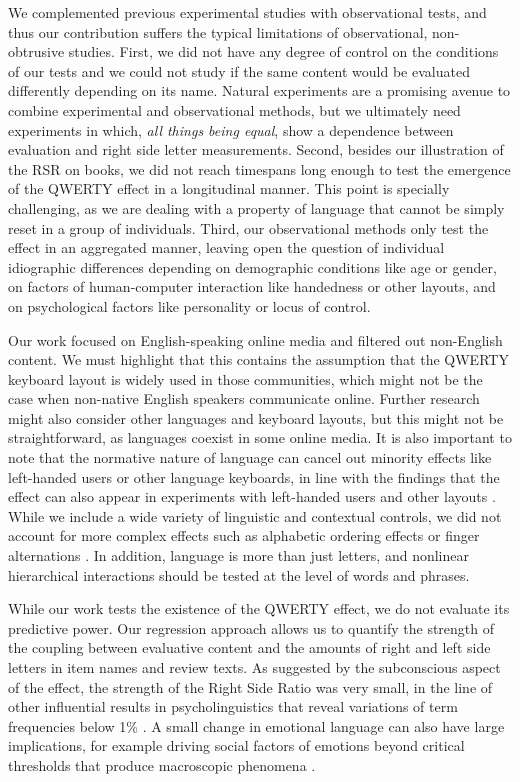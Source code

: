 \documentclass[letterpaper]{sig-alternate-2013}
\begin{document}
We complemented previous experimental studies with
observational tests, and thus our contribution suffers the typical limitations
of observational, non-obtrusive studies. First, we did not have any degree of
control on the conditions of our tests and  we could not study if the same
content would be evaluated differently depending on its name. Natural
experiments are a promising avenue to combine experimental and observational
methods, but we ultimately need experiments in which, \emph{all things being
equal}, show a dependence between evaluation and right side letter
measurements. Second, besides our illustration of the RSR on books, we did not
reach timespans long enough to test the emergence of the QWERTY effect in a
longitudinal manner. This point is specially challenging, as we are dealing
with a property of language that cannot be simply reset in a group of
individuals.  Third, our observational methods only test the effect in an
aggregated manner, leaving open the question of individual idiographic
differences depending on demographic conditions like age or gender, on factors
of human-computer interaction like handedness or other layouts, and on
psychological factors like personality or locus of control.

Our work focused on English-speaking online media and filtered out non-English
content. We must highlight that this contains the assumption that the QWERTY
keyboard layout is widely used in those communities, which might not be the
case when non-native English speakers communicate online. Further research
might also consider other languages and keyboard layouts, but this might not
be straightforward, as languages coexist in some online media. It is also
important to note that the normative nature of language can cancel out
minority effects like left-handed users or other language keyboards, in line
with the findings that the effect can also appear in experiments with left-handed
users and other layouts \cite{Casasanto2014}. While we include a wide variety
of linguistic and contextual controls, we did not account for more complex
effects such as alphabetic ordering effects or finger alternations
\cite{Jasmin2012}. In addition, language is more than just letters, and
nonlinear hierarchical interactions should be tested at the level of words and
phrases.

While our work tests the existence of the QWERTY effect, we do not evaluate
its predictive power. Our regression approach allows us to quantify the
strength of the coupling between evaluative content and the amounts of right
and left side letters in item names and review texts.  As suggested by the
subconscious aspect of the effect, the strength of the Right Side Ratio was
very small, in the line of other influential results in psycholinguistics that
reveal variations of term frequencies below 1\% \cite{Golder2011,Kramer2014}.
A small change in emotional language can also have
large implications, for example driving social factors of emotions beyond
critical thresholds that produce macroscopic phenomena
\cite{Schweitzer2010,Alvarez2015}.
\end{document}
